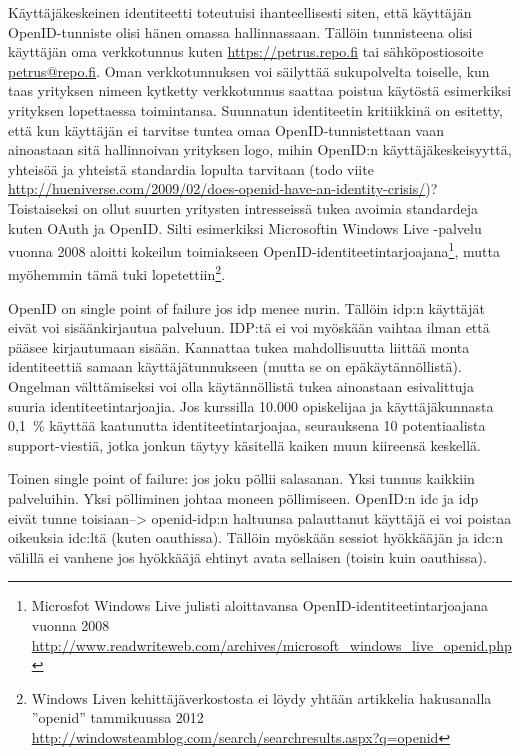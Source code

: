 \documentclass[finnish,gradu]{tktltiki}
\begin{document}
  Käyttäjäkeskeinen identiteetti toteutuisi ihanteellisesti siten, että käyttäjän OpenID-tunniste olisi hänen omassa hallinnassaan. Tällöin tunnisteena olisi käyttäjän oma verkkotunnus kuten \url{https://petrus.repo.fi} tai sähköpostiosoite \url{petrus@repo.fi}. Oman verkkotunnuksen voi säilyttää sukupolvelta toiselle, kun taas yrityksen nimeen kytketty verkkotunnus saattaa poistua käytöstä esimerkiksi yrityksen lopettaessa toimintansa. Suunnatun identiteetin kritiikkinä on esitetty, että kun käyttäjän ei tarvitse tuntea omaa OpenID-tunnistettaan vaan ainoastaan sitä hallinnoivan yrityksen logo, mihin OpenID:n käyttäjäkeskeisyyttä, yhteisöä ja yhteistä standardia lopulta tarvitaan (todo viite \url{http://hueniverse.com/2009/02/does-openid-have-an-identity-crisis/})? Toistaiseksi on ollut suurten yritysten intresseissä tukea avoimia standardeja kuten OAuth ja OpenID. Silti esimerkiksi Microsoftin Windows Live -palvelu vuonna 2008 aloitti kokeilun toimiakseen OpenID-identiteetintarjoajana\footnote{Microsfot Windows Live julisti aloittavansa OpenID-identiteetintarjoajana vuonna 2008 \url{http://www.readwriteweb.com/archives/microsoft_windows_live_openid.php}}, mutta myöhemmin tämä tuki lopetettiin\footnote{Windows Liven kehittäjäverkostosta ei löydy yhtään artikkelia hakusanalla ''openid'' tammikuussa 2012 \url{http://windowsteamblog.com/search/searchresults.aspx?q=openid}}.


  OpenID on single point of failure jos idp menee nurin. Tällöin idp:n käyttäjät eivät voi sisäänkirjautua palveluun. IDP:tä ei voi myöskään vaihtaa ilman että pääsee kirjautumaan sisään. Kannattaa tukea mahdollisuutta liittää monta identiteettiä samaan käyttäjätunnukseen (mutta se on epäkäytännöllistä). Ongelman välttämiseksi voi olla käytännöllistä tukea ainoastaan esivalittuja suuria identiteetintarjoajia. Jos kurssilla 10.000 opiskelijaa ja käyttäjäkunnasta 0,1~\% käyttää kaatunutta identiteetintarjoajaa, seurauksena 10 potentiaalista support-viestiä, jotka jonkun täytyy käsitellä kaiken muun kiireensä keskellä.

  Toinen single point of failure: jos joku pöllii salasanan. Yksi tunnus kaikkiin palveluihin. Yksi pölliminen johtaa moneen pöllimiseen. OpenID:n idc ja idp eivät tunne toisiaan--> openid-idp:n haltuunsa palauttanut käyttäjä ei voi poistaa oikeuksia idc:ltä (kuten oauthissa). Tällöin myöskään sessiot hyökkääjän ja idc:n välillä ei vanhene jos hyökkääjä ehtinyt avata sellaisen (toisin kuin oauthissa).
\end{document}
